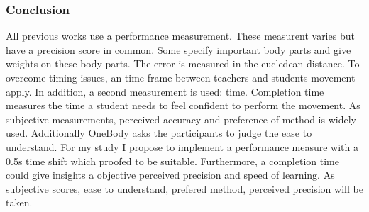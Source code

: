 \subsubsection{Conclusion}
All previous works use a performance measurement. These measurent varies but have a precision score in common. Some specify important body parts and give weights on these body parts. The error is measured in the eucledean distance. To overcome timing issues, an time frame between teachers and students movement apply. In addition, a second measurement is used: time. Completion time measures the time a student needs to feel confident to perform the movement. As subjective measurements, perceived accuracy and preference of method is widely used. Additionally OneBody asks the participants to judge the ease to understand. For my study I propose to implement a performance measure with a 0.5s time shift which proofed to be suitable. Furthermore, a completion time could give insights a objective perceived precision and speed of learning. As subjective scores, ease to understand, prefered method, perceived precision will be taken.

